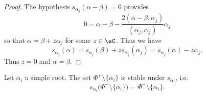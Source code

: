 \begin{proof}
    The hypothesis \( s_{\alpha_j}(\alpha-\beta)=0\) provides
    \begin{equation}
        0=\alpha-\beta-\frac{ 2(\alpha-\beta,\alpha_j) }{ (\alpha_j,\alpha_j) }\alpha_j
    \end{equation}
    so that \( \alpha=\beta+z\alpha_j\) for some \( z\in\eC\). Thus we have
    \begin{equation}
        s_{\alpha_j}(\alpha)=s_{\alpha_j}(\beta)+zs_{\alpha_j}(\alpha_j)=s_{\alpha_j}(\alpha)-z\alpha_j.
    \end{equation}
    Thus \( z=0\) and \( \alpha=\beta\).
\end{proof}

\begin{proposition}     \label{PropsalphaisurjPhipmaj}
    Let \( \alpha_i\) a simple root. The set \( \Phi^+\setminus\{ \alpha_i \}\) is stable under \( s_{\alpha_i}\), i.e.
    \begin{equation}
        s_{\alpha_i}\big( \Phi^+\setminus\{ \alpha_i \} \big)=\Phi^+\setminus\{ \alpha_i \}.
    \end{equation}
\end{proposition}

